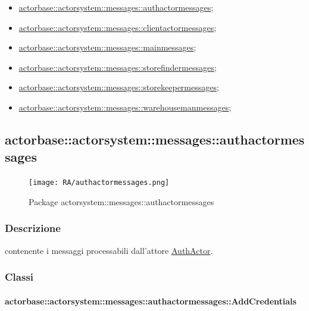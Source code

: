 \documentclass{scalatekids-article}
\begin{document}
\begin{itemize}
\item \hyperref[sec:actorbase::actorsystem::messages::authactormessages]{actorbase::actorsystem::messages::authactormessages};
\item \hyperref[sec:actorbase::actorsystem::messages::clientactormessages]{actorbase::actorsystem::messages::clientactormessages};
\item \hyperref[sec:actorbase::actorsystem::messages::mainmessages]{actorbase::actorsystem::messages::mainmessages};
\item \hyperref[sec:actorbase::actorsystem::messages::storefindermessages]{actorbase::actorsystem::messages::storefindermessages};
\item \hyperref[sec:actorbase::actorsystem::messages::storekeepermessages]{actorbase::actorsystem::messages::storekeepermessages};
\item \hyperref[sec:actorbase::actorsystem::messages::warehousemanmessages]{actorbase::actorsystem::messages::warehousemanmessages};
\end{itemize}

\subsection{actorbase::actorsystem::messages::authactormessages}
\label{sec:actorbase::actorsystem::messages::authactormessages}

\begin{figure}[H]
  \begin{center}
    \texttt{[image: RA/authactormessages.png]}
    \caption{Package actorsystem::messages::authactormessages}
  \end{center}
\end{figure}

\subsubsection{Descrizione}
 contenente i messaggi processabili dall'attore \hyperref[sec:actorbase::actorsystem::actors::authactor::AuthActor]{AuthActor}.

\subsubsection{Classi}

\paragraph{actorbase::actorsystem::messages::authactormessages::AddCredentials}
\label{sec:actorbase::actorsystem::messages::authactormessages::AddCredentials}
\end{document}
